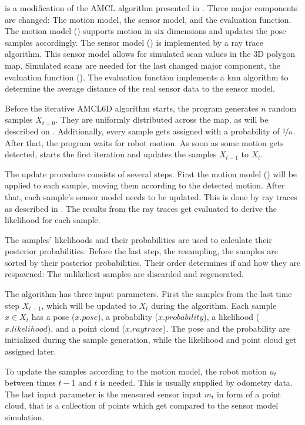 \documentclass[Thesis.tex]{subfiles}
\begin{document}
%
 is a modification of the \gls{AMCL} algorithm presented in \cite{ThrunBurgardFox:2005}. Three major components are changed: The motion model, the sensor model, and the evaluation function. The motion model () supports motion in six dimensions and updates the pose samples accordingly. The sensor model () is implemented by a ray trace algorithm. This sensor model allows for simulated scan values in the 3D polygon map. Simulated scans are needed for the last changed major component, the evaluation function (). The evaluation function implements a \gls{knn} algorithm to determine the average distance of the real sensor data to the sensor model.

Before the iterative \gls{AMCL6D} algorithm starts, the program generates $n$ random samples $X_{t=0}$. They are uniformly distributed across the map, as will be described on . Additionally, every sample gets assigned with a probability of $\nicefrac{1}{n}$.  After that, the program waits for robot motion. As soon as some motion gets detected,  starts the first iteration and updates the samples $X_{t-1}$ to $X_{t}$.

The update procedure consists of several steps. First the motion model () will be applied to each sample, moving them according to the detected motion. After that, each sample's sensor model needs to be updated. This is done by ray traces as described in . The results from the ray traces get evaluated to derive the likelihood for each sample.

The samples' likelihoods and their probabilities are used to calculate their posterior probabilities. Before the last step, the resampling, the samples are sorted by their posterior probabilities. Their order determines if and how they are respawned: The unlikeliest samples are discarded and regenerated.

\smallskip

The algorithm has three input parameters. First the samples from the last time step $X_{t-1}$, which will be updated to $X_t$ during the algorithm. Each sample $x \in X_t$ has a pose ($x.pose$), a probability ($x.probability$), a likelihood ($x.likelihood$), and a point cloud ($x.raytrace$). The pose and the probability are initialized during the sample generation, while the likelihood and point cloud get assigned later.

To update the samples according to the motion model, the robot motion $u_{t}$ between times $t-1$ and $t$ is needed. This is usually supplied by odometry data. The last input parameter is the measured sensor input $m_{t}$ in form of a point cloud, that is a collection of points which get compared to the sensor model simulation.
\end{document}
